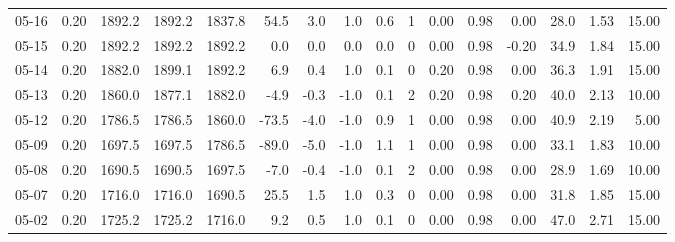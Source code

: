 \begin{threeparttable}
{\begin{tabular}{lrrrrrrrrrrrrrrr}
  05-16 &     0.20 & 1892.2 & 1892.2 & 1837.8 &       54.5 &            3.0 &                      1.0 &                 0.6 &              1 &       0.00 &      0.98 &           0.00 &             28.0 &            1.53 &                  15.00 \\
  05-15 &     0.20 & 1892.2 & 1892.2 & 1892.2 &        0.0 &            0.0 &                      0.0 &                 0.0 &              0 &       0.00 &      0.98 &          -0.20 &             34.9 &            1.84 &                  15.00 \\
  05-14 &     0.20 & 1882.0 & 1899.1 & 1892.2 &        6.9 &            0.4 &                      1.0 &                 0.1 &              0 &       0.20 &      0.98 &           0.00 &             36.3 &            1.91 &                  15.00 \\
  05-13 &     0.20 & 1860.0 & 1877.1 & 1882.0 &       -4.9 &           -0.3 &                     -1.0 &                 0.1 &              2 &       0.20 &      0.98 &           0.20 &             40.0 &            2.13 &                  10.00 \\
  05-12 &     0.20 & 1786.5 & 1786.5 & 1860.0 &      -73.5 &           -4.0 &                     -1.0 &                 0.9 &              1 &       0.00 &      0.98 &           0.00 &             40.9 &            2.19 &                   5.00 \\
  05-09 &     0.20 & 1697.5 & 1697.5 & 1786.5 &      -89.0 &           -5.0 &                     -1.0 &                 1.1 &              1 &       0.00 &      0.98 &           0.00 &             33.1 &            1.83 &                  10.00 \\
  05-08 &     0.20 & 1690.5 & 1690.5 & 1697.5 &       -7.0 &           -0.4 &                     -1.0 &                 0.1 &              2 &       0.00 &      0.98 &           0.00 &             28.9 &            1.69 &                  10.00 \\
  05-07 &     0.20 & 1716.0 & 1716.0 & 1690.5 &       25.5 &            1.5 &                      1.0 &                 0.3 &              0 &       0.00 &      0.98 &           0.00 &             31.8 &            1.85 &                  15.00 \\
  05-02 &     0.20 & 1725.2 & 1725.2 & 1716.0 &        9.2 &            0.5 &                      1.0 &                 0.1 &              0 &       0.00 &      0.98 &           0.00 &             47.0 &            2.71 &                  15.00 \\

\end{tabular}}
\end{threeparttable}
